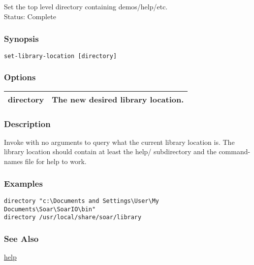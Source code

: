 \subsection{}
\label{set-library-location}
Set the top level directory containing demos/help/etc.\\ 
 Status: Complete
\subsubsection*{Synopsis}
\begin{verbatim}
set-library-location [directory] 
\end{verbatim}
\subsubsection*{Options}
\begin{tabular}{|l|l|}
\hline 
 directory  & The new desired library location.  \\
 \hline 
\end{tabular}
\subsubsection*{Description}
 Invoke with no arguments to query what the current library location is. The library location should contain at least the help/ subdirectory and the command-names file for help to work. 
\subsubsection*{Examples}
\begin{verbatim}
directory "c:\Documents and Settings\User\My Documents\Soar\SoarIO\bin"
directory /usr/local/share/soar/library
\end{verbatim}
\subsubsection*{See Also}
\hyperref[help]{help} 